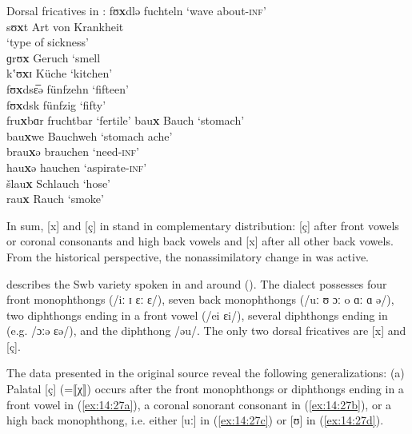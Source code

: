 \ea%
\label{ex:14:26}Dorsal fricatives in :
\ea fʊ\textbf{x}dlə \tab [fʊçdlə] \tab fuchteln \tab ‘wave about\textsc{{}-inf}’ \\\label{ex:14:26a}
    sʊ\textbf{x}t \tab [sʊçt] \tab Art von Krankheit\\
    \tab \tab  ‘type of sickness’ \\
    ɡrʊ\textbf{x} \tab [grʊç] \tab Geruch \tab ‘smell \\
    kʽʊ\textbf{x}ɪ \tab [kʰʊçɪ] \tab Küche \tab ‘kitchen’ \\
    fʊ\textbf{x}dsɛ̅ə \tab [fʊçdsɛːə] \tab fünfzehn \tab ‘fifteen’ \\
    fʊ\textbf{x}dsk \tab [fʊçdsk] \tab fünfzig \tab ‘fifty’ \\
\ex fru\textbf{x}bɑr \tab [fruçbɑr] \tab fruchtbar \tab ‘fertile’ \label{ex:14:26b}
\ex bau\textbf{x} \tab [bɑuç] \tab Bauch \tab ‘stomach’ \\\label{ex:14:26c}
    bau\textbf{x}we \tab [bɑuçve] \tab Bauchweh \tab ‘stomach ache’ \\
    brau\textbf{x}ə \tab [brɑuçe] \tab brauchen \tab ‘need\textsc{{}-inf}’ \\
    hau\textbf{x}ə \tab [hɑuçe] \tab hauchen \tab ‘aspirate\textsc{{}-inf}’ \\
    šlau\textbf{x} \tab [ʃlɑuç] \tab Schlauch \tab ‘hose’ \\
    rau\textbf{x} \tab [rɑuç] \tab Rauch \tab ‘smoke’ 
\z 
\z 

In sum, [x] and [ç] in  stand in complementary distribution: [ç] after front vowels or coronal consonants and high back vowels and [x] after all other back vowels. From the historical perspective, the nonassimilatory change in  was active.

\citet{Dreher1919} describes the Swb variety spoken in and around  (). The dialect possesses four front monophthongs (/iː ɪ ɛː ɛ/), seven back monophthongs (/uː ʊ ɔː o ɑː ɑ ə/), two diphthongs ending in a front vowel (/ei ɛi/), several diphthongs ending in  (e.g. /ɔːə ɛə/), and the diphthong /əu/. The only two dorsal fricatives are [x] and [ç].

The data presented in the original source reveal the following generalizations: (a) Palatal [ç] (=⟦χ⟧) occurs after the front monophthongs or diphthongs ending in a front vowel in (\ref{ex:14:27a}), a coronal sonorant consonant in (\ref{ex:14:27b}), or a high back monophthong, i.e. either [uː] in (\ref{ex:14:27c}) or [ʊ] in (\ref{ex:14:27d}).

